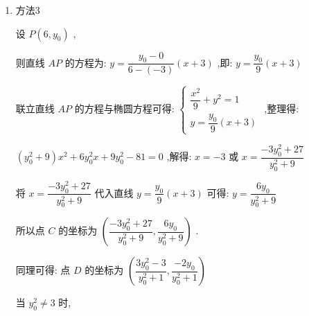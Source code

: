 \begin{enumerate}
\begin{jieda}
\begin{enumerate}
\begin{enumerate}
            联立椭圆和两直线的方程：$\left\{\begin{array}{l}
                 {t}^{2}\left( {{x}^{2} - 9}\right)  + {27}{y}^{2} - {12txy} + {18ty} = 0  \\
                 \dfrac{{x}^{2}}{9} + {y}^{2} = 1 
            \end{array}\right.$，消去$x^2$可得 $\left( {{27} - 9{t}^{2}}\right) {y}^{2} - {12txy} + {18ty} = 0$ .
            
            故 $y\left\lbrack  {\left( {{27} - 9{t}^{2}}\right) y - {12tx} + {18t}}\right\rbrack   = 0$ ,可得 $y = 0$ 或 $\left( {{27} - 9{t}^{2}}\right) y - {12tx} + {18t} = 0$ .
            
            其中 $y = 0$ 表示直线 ${AB}$ ,则 $\left( {{27} - 9{t}^{2}}\right) y - {12tx} + {18t} = 0$ 表示直线 ${CD}$ .
            
            令 $y = 0$ ,得 $x = \dfrac{3}{2}$ ,即直线 ${CD}$ 恒过点 $\left( {\dfrac{3}{2},0}\right)$ .
        \item 方法3

        设 $P\left( {6,{y}_{0}}\right)$ ,
        
        则直线 ${AP}$ 的方程为: $y = \dfrac{{y}_{0} - 0}{6 - \left( {-3}\right) }\left( {x + 3}\right)$ ,即: $y = \dfrac{{y}_{0}}{9}\left( {x + 3}\right)$
        
        联立直线 ${AP}$ 的方程与椭圆方程可得: $\left\{  \begin{array}{l} \dfrac{{x}^{2}}{9} + {y}^{2} = 1 \\  y = \dfrac{{y}_{0}}{9}\left( {x + 3}\right)  \end{array}\right.$ ,整理得:
        
        $\left( {{y}_{0}^{2} + 9}\right) {x}^{2} + 6{y}_{0}^{2}x + 9{y}_{0}^{2} - {81} = 0$ ,解得: $x =  - 3$ 或 $x = \dfrac{-3{y}_{0}^{2} + {27}}{{y}_{0}^{2} + 9}$
        
        将 $x = \dfrac{-3{y}_{0}^{2} + {27}}{{y}_{0}^{2} + 9}$ 代入直线 $y = \dfrac{{y}_{0}}{9}\left( {x + 3}\right)$ 可得: $y = \dfrac{6{y}_{0}}{{y}_{0}^{2} + 9}$
        
        所以点 $C$ 的坐标为 $\left( {\dfrac{-3{y}_{0}^{2} + {27}}{{y}_{0}^{2} + 9},\dfrac{6{y}_{0}}{{y}_{0}^{2} + 9}}\right)$ .
        
        同理可得: 点 $D$ 的坐标为 $\left( {\dfrac{3{y}_{0}^{2} - 3}{{y}_{0}^{2} + 1},\dfrac{-2{y}_{0}}{{y}_{0}^{2} + 1}}\right)$
        
        当 ${y}_{0}^{2} \neq  3$ 时,
        

\end{enumerate}
\end{enumerate}
\end{jieda}
\end{enumerate}
